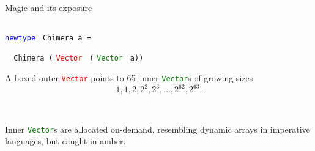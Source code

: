 \documentclass[handout]{beamer}
\begin{document}
\begin{frame}[fragile]{Magic and its exposure}

\begin{columns}[T]
  \begin{column}{.55\textwidth}

\textcolor{blue}{\tt newtype }%
{\tt Chimera a =}%
\par
{\tt ~~Chimera (}%
\textcolor{red}{\tt Vector }%
{\tt (}%
\textcolor{green}{\tt Vector }%
{\tt a))}

\bigskip

A boxed outer
\textcolor{red}{\tt Vector}
points to 65~inner
\textcolor{green}{\tt Vector}s
of growing sizes
$$
1, 1, 2, 2^2, 2^3, \ldots, 2^{62}, 2^{63}.
$$

 ~
 ~
\vspace{1ex}\par
\hfill
{}

\bigskip

Inner
\textcolor{green}{\tt Vector}s
are allocated on-demand,
resembling
dynamic arrays in imperative languages,
but caught in amber.

\end{column}


\end{columns}
\end{frame}
\end{document}
